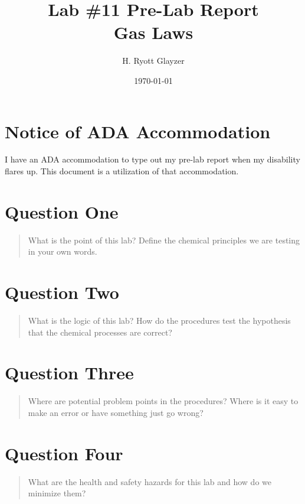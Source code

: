 \documentclass[11pt, letterpaper]{article}
\begin{document}


\title{Lab \#11 Pre-Lab Report \\ \large Gas Laws}
\author{H. Ryott Glayzer}
\date{\today}


\maketitle


\section*{Notice of ADA Accommodation}
I have an ADA accommodation to type out my pre-lab report when my disability flares up.
This document is a utilization of that accommodation.

\section{Question One}
\begin{quote}
    What is the point of this lab? Define the chemical principles we are testing in your own words.
\end{quote}






\section{Question Two}
\begin{quote}
    What is the logic of this lab? How do the procedures test the hypothesis that the chemical 
    processes are correct?
\end{quote}






\section{Question Three}
\begin{quote}
    Where are potential problem points in the procedures? Where is it easy to make an error 
    or have something just go wrong?
\end{quote}






\section{Question Four}
\begin{quote}
    What are the health and safety hazards for this lab and how do we minimize them?
\end{quote}
\end{document}
